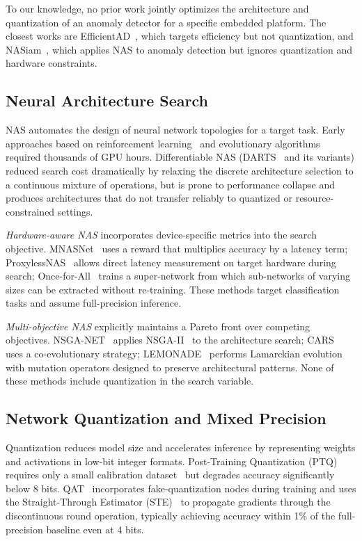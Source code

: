 \documentclass[journal]{IEEEtran}
\begin{document}
To our knowledge, no prior work jointly optimizes the architecture and
quantization of an anomaly detector for a specific embedded platform.
The closest works are
EfficientAD~\cite{batzner2024efficientad}, which targets efficiency but not
quantization, and
NASiam~\cite{TODO_nasiam}, which applies NAS to anomaly detection but ignores
quantization and hardware constraints.

\subsection{Neural Architecture Search}

NAS automates the design of neural network topologies for a target task.
Early approaches based on reinforcement learning~\cite{zoph2017neural} and
evolutionary algorithms~\cite{real2019regularized} required thousands of GPU
hours.
Differentiable NAS (DARTS~\cite{liu2019darts} and its variants) reduced
search cost dramatically by relaxing the discrete architecture selection to a
continuous mixture of operations, but is prone to performance collapse and
produces architectures that do not transfer reliably to quantized or
resource-constrained settings.

\textit{Hardware-aware NAS} incorporates device-specific metrics into the
search objective.
MNASNet~\cite{tan2019mnasnet} uses a reward that multiplies accuracy by a
latency term; ProxylessNAS~\cite{cai2019proxylessnas} allows direct latency
measurement on target hardware during search;
Once-for-All~\cite{cai2020ofa} trains a super-network from which sub-networks
of varying sizes can be extracted without re-training.
These methods target classification tasks and assume full-precision inference.

\textit{Multi-objective NAS} explicitly maintains a Pareto front over
competing objectives.
NSGA-NET~\cite{lu2019nsga} applies NSGA-II~\cite{deb2002fast} to the
architecture search; CARS~\cite{yang2020cars} uses a co-evolutionary strategy;
LEMONADE~\cite{elsken2019lemonade} performs Lamarckian evolution with mutation
operators designed to preserve architectural patterns.
None of these methods include quantization in the search variable.

\subsection{Network Quantization and Mixed Precision}

Quantization reduces model size and accelerates inference by representing
weights and activations in low-bit integer formats.
Post-Training Quantization (PTQ) requires only a small calibration
dataset~\cite{nagel2020up,hubara2021accurate} but degrades accuracy
significantly below 8 bits.
QAT~\cite{jacob2018quantization} incorporates fake-quantization nodes during
training and uses the Straight-Through Estimator (STE)~\cite{bengio2013estimating}
to propagate gradients through the discontinuous round operation, typically
achieving accuracy within 1\% of the full-precision baseline even at 4 bits.
\end{document}
